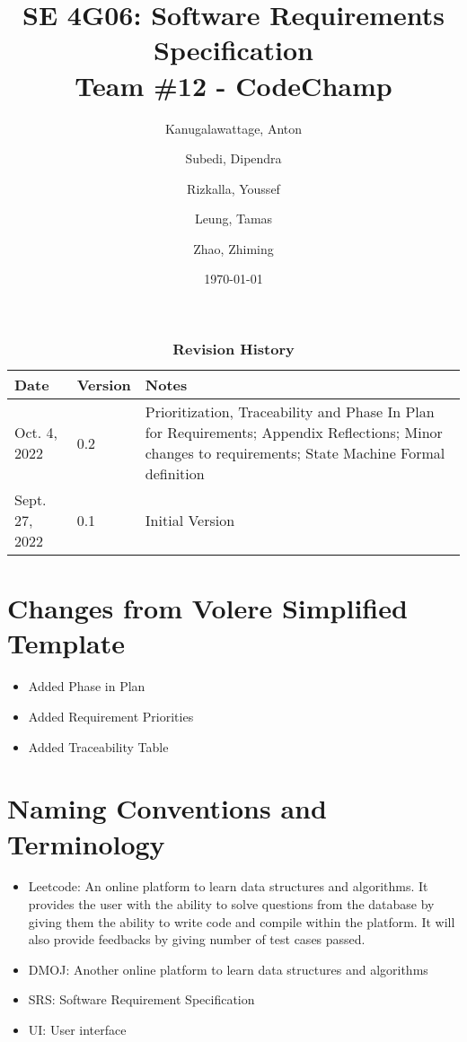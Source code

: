 \documentclass[12pt, titlepage]{article}
\title{SE 4G06: Software Requirements Specification\\Team \#12 - CodeChamp}
\author{
  Kanugalawattage, Anton
  \and
  Subedi, Dipendra
  \and
  Rizkalla, Youssef
  \and
  Leung, Tamas
  \and
  Zhao, Zhiming
}
\date{\today}
\begin{document}
\maketitle


\begin{table}[h]
\caption{\bf Revision History}
\begin{tabularx}{\textwidth}{p{3cm}p{2cm}X}
\toprule {\bf Date} & {\bf Version} & {\bf Notes}\\
\midrule
Oct. 4, 2022 & 0.2 & Prioritization, Traceability and Phase In Plan for Requirements; Appendix Reflections; Minor changes to requirements; State Machine Formal definition\\
Sept. 27, 2022 & 0.1 & Initial Version\\
\bottomrule
\end{tabularx}
\end{table}

\newpage

\tableofcontents
\listoftables
\listoffigures

\newpage


\section*{Changes from Volere Simplified Template}
\begin{itemize}
    \item Added Phase in Plan
    \item Added Requirement Priorities
    \item Added Traceability Table
\end{itemize}

\section*{Naming Conventions and Terminology}
\begin{itemize}
    \item Leetcode: An online platform to learn data structures and algorithms. It provides the user with the ability to solve questions from the database by giving them the ability to write code and compile within the platform. It will also provide feedbacks by giving number of test cases passed.
    \item DMOJ: Another online platform to learn data structures and algorithms
    \item SRS: Software Requirement Specification
    \item UI: User interface
\end{itemize}
\end{document}
